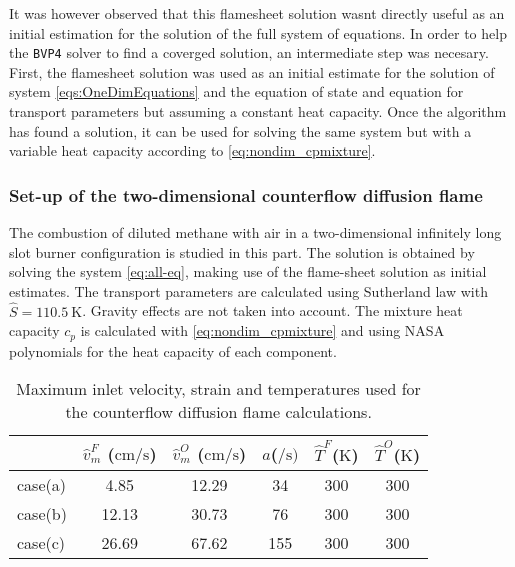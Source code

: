 It was however observed that this flamesheet solution wasnt directly useful as an initial estimation for the solution of the full system of equations. In order to help  the \lstinline|BVP4| solver to find a coverged solution, an intermediate step was necesary. First, the flamesheet solution was used as an initial estimate for the solution of system \cref{eqs:OneDimEquations} and the equation of state and equation for transport parameters but assuming a constant heat capacity. Once the algorithm has found a solution, it can be used for solving the same system but with a variable heat capacity according to \cref{eq:nondim_cpmixture}.


\subsubsection{Set-up of the two-dimensional counterflow diffusion flame}

The combustion of diluted methane with air in a two-dimensional infinitely long slot burner configuration is studied in this part. The solution is obtained by solving the system \cref{eq:all-eq}, making use of the flame-sheet solution as initial estimates. The transport parameters are calculated using Sutherland law with $\hat{S} = \SI{110.5}{\kelvin}$. Gravity effects are not taken into account.  The mixture heat capacity $c_p$ is calculated with \cref{eq:nondim_cpmixture} and using NASA polynomials for the heat capacity of each component.
\begin{table}[b]
	\centering
	\begin{tabular}{lccccc}
		\hline
		& \multicolumn{1}{l}{$\hat v^F_m$ ($\si{\centi \meter \per \second}$)} & \multicolumn{1}{l}{$\hat v^O_m$ ($\si{\centi \meter \per \second}$)} & $a$($\si{\per\second})$ & \multicolumn{1}{l}{$\hat T^F$($\si{\kelvin}$)} & \multicolumn{1}{l}{$\hat T^O$($\si{\kelvin}$)} \\ \hline
		case(a) & 4.85                                                                 & 12.29                                                                & 34                     & 300                                            & 300                                           \\
		case(b) & 12.13                                                                & 30.73                                                                & 76                     & 300                                            & 300                                           \\
		case(c) & 26.69                                                                & 67.62                                                                & 155                    & 300                                            & 300                                           \\ \hline
	\end{tabular}
	\caption{Maximum inlet velocity, strain and temperatures used for the counterflow diffusion flame calculations.}
	\label{tab:cdf_velocities}
\end{table}

